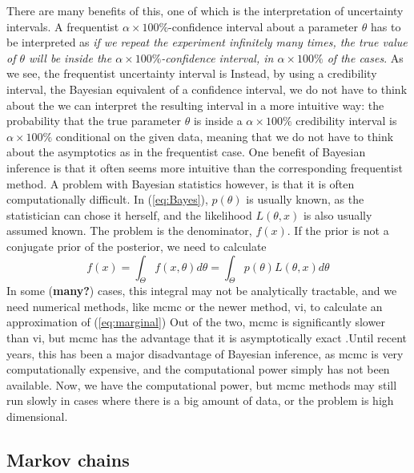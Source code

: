\documentclass{article}
\theoremstyle{definition}
\begin{document}
There are many benefits of this, one of which is the interpretation of uncertainty intervals. 
A frequentist $\alpha \times 100\%$-confidence interval about a parameter $\theta$ has to be interpreted as \textit{if we repeat the experiment infinitely many times, the true value of $\theta$ will be inside the $\alpha\times 100\%$-confidence interval, in $\alpha\times 100\%$ of the cases}. As we see, the frequentist uncertainty interval is  
Instead, by using a credibility interval, the Bayesian equivalent of a confidence interval, we do not have to think about the  we can interpret the resulting interval in a more intuitive way: the probability that the true parameter $\theta$ is inside a $\alpha\times 100\%$ credibility interval is $\alpha\times 100\%$ conditional on the given data, meaning that we do not have to think about the asymptotics as in the frequentist case.  One benefit of Bayesian inference is that it often seems more intuitive than the corresponding frequentist method. 
A problem with Bayesian statistics however, is that it is often computationally difficult. In (\ref{eq:Bayes}), $p\left(\theta\right)$ is usually known, as the statistician can chose it herself, and the likelihood $L\left(\theta, x\right)$ is also usually assumed known. The problem is the denominator, $f\left(x\right)$. If the prior is not a conjugate prior of the posterior, we need to calculate 
\begin{equation}\label{eq:marginal}
    f\left(x\right) = \int_{\Theta}f\left(x,\theta\right) d\theta = \int_{\Theta} p\left(\theta\right)L\left(\theta, x\right) d\theta
\end{equation}
In some (\textbf{many?}) cases, this integral may not be analytically tractable, and we need numerical methods, like \gls{mcmc} or the newer method, \gls{vi}, to calculate an approximation of (\ref{eq:marginal}) Out of the two, \gls{mcmc} is significantly slower than \gls{vi}, but \gls{mcmc} has the advantage that it is asymptotically exact \cite{vi} .Until recent years, this has been a major disadvantage of Bayesian inference, as \gls{mcmc} is very computationally expensive, and the computational power simply has not been available.  Now, we have the computational power, but \gls{mcmc} methods may still run slowly in cases where there is a big amount of data, or the problem is high dimensional. 
\subsection{Markov chains}\label{sec:markov}
\end{document}

